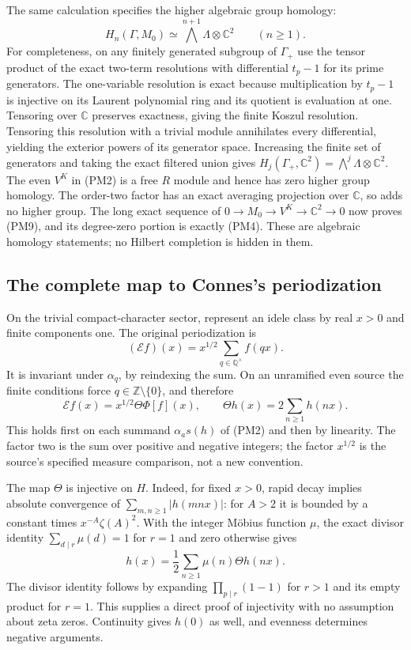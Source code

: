 \documentclass[11pt,a4paper]{article}
\theoremstyle{definition}\newtheorem{definition}[theorem]{Definition}
\begin{document}
The same calculation specifies the higher algebraic group
homology:
\[
 H_n(\Gamma,M_0)\simeq
       \bigwedge^{n+1}\Lambda\otimes\mathbb C^2
       \qquad(n\ge1).
 \tag{PM9}
\]
For completeness, on any finitely generated subgroup of
$\Gamma_+$ use the tensor product of the exact two-term
resolutions with differential $t_p-1$ for its prime generators.
The one-variable resolution is exact because multiplication
by $t_p-1$ is injective on its Laurent polynomial ring and
its quotient is evaluation at one. Tensoring over $\mathbb C$
preserves exactness, giving the finite Koszul resolution.
Tensoring this resolution with a trivial module annihilates
every differential, yielding the exterior powers of its
generator space. Increasing the finite set of generators
and taking the exact filtered union gives
$H_j(\Gamma_+,\mathbb C^2)=\bigwedge^j\Lambda\otimes\mathbb C^2$.
The even $V^K$ in (PM2) is a free $R$ module and hence has
zero higher group homology. The order-two factor has an exact
averaging projection over $\mathbb C$, so adds no higher group.
The long exact sequence of
$0\to M_0\to V^K\to\mathbb C^2\to0$ now proves (PM9),
and its degree-zero portion is exactly (PM4).
These are algebraic homology statements; no Hilbert completion
is hidden in them.

\subsection{The complete map to Connes's periodization}

On the trivial compact-character sector, represent an idele
class by real $x>0$ and finite components one. The original
periodization is
\[
 (\mathcal E f)(x)=x^{1/2}\sum_{q\in\mathbb Q^\times}f(qx).
 \tag{PM10}
\]
It is invariant under $\alpha_q$, by reindexing the sum. On
an unramified even source the finite conditions force
$q\in\mathbb Z\setminus\{0\}$, and therefore
\[
 \mathcal E f(x)=x^{1/2}\Theta\Phi[f](x),\qquad
 \Theta h(x)=2\sum_{n\ge1}h(nx).
 \tag{PM11}
\]
This holds first on each summand $\alpha_a s(h)$ of (PM2)
and then by linearity. The factor two is the sum over positive
and negative integers; the factor $x^{1/2}$ is the source's
specified measure comparison, not a new convention.

The map $\Theta$ is injective on $H$. Indeed, for fixed $x>0$,
rapid decay implies absolute convergence of
$\sum_{m,n\ge1}|h(mnx)|$: for $A>2$ it is bounded by
a constant times $x^{-A}\zeta(A)^2$. With the integer Möbius
function $\mu$, the exact divisor identity
$\sum_{d\mid r}\mu(d)=1$ for $r=1$ and zero otherwise gives
\[
 h(x)=\frac12\sum_{n\ge1}\mu(n)\Theta h(nx).
 \tag{PM12}
\]
The divisor identity follows by expanding
$\prod_{p\mid r}(1-1)$ for $r>1$ and its empty product for
$r=1$. This supplies a direct proof of injectivity with no
assumption about zeta zeros. Continuity gives $h(0)$ as well,
and evenness determines negative arguments.
\end{document}

